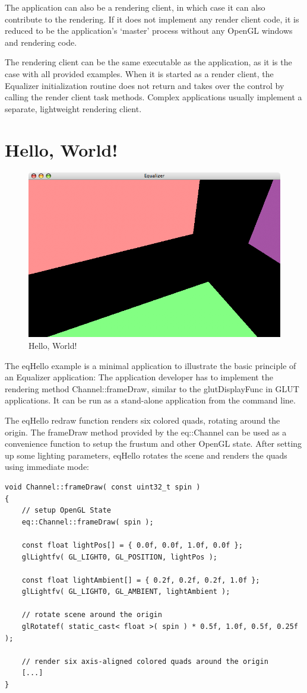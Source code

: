 \documentclass[10pt,a4]{scrartcl}
\begin{document}
The application can also be a rendering client, in which case it can
also contribute to the rendering. If it does not implement any render
client code, it is reduced to be the application's `master' process
without any OpenGL windows and rendering code.

The rendering client can be the same executable as the application, as
it is the case with all provided examples. When it is started as a
render client, the Equalizer initialization routine does not return and
takes over the control by calling the render client task
methods. Complex applications usually implement a separate, lightweight
rendering client.


\section{Hello, World!}

\begin{figure}
  \includegraphics[width=.618\textwidth]{images/eqHello.png}
  {\caption{\small\label{fHello}Hello, World!}}
\end{figure}
The \textsf{eqHello} example is a minimal application to illustrate the
basic principle of an Equalizer application: The application developer
has to implement the rendering method \textsf{Channel::frameDraw},
similar to the \textsf{glutDisplayFunc} in GLUT applications. It can be
run as a stand-alone application from the command line.

The \textsf{eqHello} redraw function renders six colored quads, rotating
around the origin. The \textsf{frameDraw} meth\-od provided by the
\textsf{eq::Channel} can be used as a convenience function to setup the
frustum and other OpenGL state. After setting up some lighting
parameters, \textsf{eqHello} rotates the scene and renders the quads
using immediate mode:

{\footnotesize\begin{lstlisting}
void Channel::frameDraw( const uint32_t spin )
{
    // setup OpenGL State
    eq::Channel::frameDraw( spin );
    
    const float lightPos[] = { 0.0f, 0.0f, 1.0f, 0.0f };
    glLightfv( GL_LIGHT0, GL_POSITION, lightPos );

    const float lightAmbient[] = { 0.2f, 0.2f, 0.2f, 1.0f };
    glLightfv( GL_LIGHT0, GL_AMBIENT, lightAmbient );

    // rotate scene around the origin
    glRotatef( static_cast< float >( spin ) * 0.5f, 1.0f, 0.5f, 0.25f );

    // render six axis-aligned colored quads around the origin
    [...]
}
\end{lstlisting}}
\end{document}
